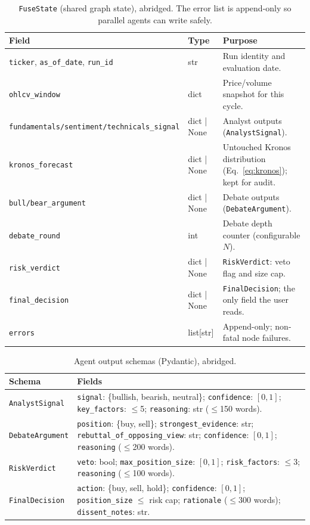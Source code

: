 \documentclass[conference]{IEEEtran}
\begin{document}
\begin{table}[!t]
\centering
\caption{\texttt{FuseState} (shared graph state), abridged. The error list is append-only so parallel agents can write safely.}
\label{tab:state}
\small
\begin{tabularx}{\columnwidth}{L{2.6cm} L{1.5cm} X}
\toprule
\textbf{Field} & \textbf{Type} & \textbf{Purpose} \\
\midrule
\texttt{ticker}, \texttt{as\_of\_date}, \texttt{run\_id} & str & Run identity and evaluation date. \\
\texttt{ohlcv\_window} & dict & Price/volume snapshot for this cycle. \\
\texttt{fundamentals/sentiment/technicals\_signal} & dict | None & Analyst outputs (\texttt{AnalystSignal}). \\
\texttt{kronos\_forecast} & dict | None & Untouched Kronos distribution (Eq.~\ref{eq:kronos}); kept for audit. \\
\texttt{bull/bear\_argument} & dict | None & Debate outputs (\texttt{DebateArgument}). \\
\texttt{debate\_round} & int & Debate depth counter (configurable $N$). \\
\texttt{risk\_verdict} & dict | None & \texttt{RiskVerdict}: veto flag and size cap. \\
\texttt{final\_decision} & dict | None & \texttt{FinalDecision}; the only field the user reads. \\
\texttt{errors} & list[str] & Append-only; non-fatal node failures. \\
\bottomrule
\end{tabularx}
\end{table}

\begin{table}[!t]
\centering
\caption{Agent output schemas (Pydantic), abridged.}
\label{tab:schemas}
\small
\begin{tabularx}{\columnwidth}{L{1.9cm} X}
\toprule
\textbf{Schema} & \textbf{Fields} \\
\midrule
\texttt{AnalystSignal} & \texttt{signal}: \{bullish, bearish, neutral\}; \texttt{confidence}: $[0,1]$; \texttt{key\_factors}: $\le$5; \texttt{reasoning}: str ($\le$150 words). \\
\addlinespace[2pt]
\texttt{DebateArgument} & \texttt{position}: \{buy, sell\}; \texttt{strongest\_evidence}: str; \texttt{rebuttal\_of\_opposing\_view}: str; \texttt{confidence}: $[0,1]$; \texttt{reasoning} ($\le$200 words). \\
\addlinespace[2pt]
\texttt{RiskVerdict} & \texttt{veto}: bool; \texttt{max\_position\_size}: $[0,1]$; \texttt{risk\_factors}: $\le$3; \texttt{reasoning} ($\le$100 words). \\
\addlinespace[2pt]
\texttt{FinalDecision} & \texttt{action}: \{buy, sell, hold\}; \texttt{confidence}: $[0,1]$; \texttt{position\_size} $\le$ risk cap; \texttt{rationale} ($\le$300 words); \texttt{dissent\_notes}: str. \\
\bottomrule
\end{tabularx}
\end{table}



\end{document}
